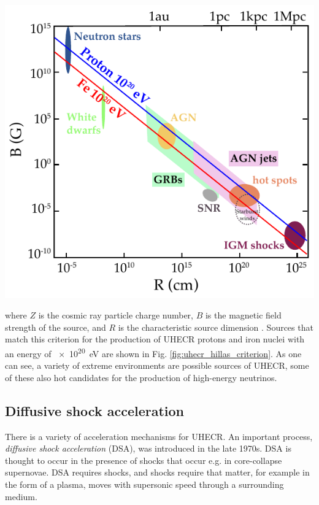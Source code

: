 \documentclass[
    a4paper, %
    fontsize=10pt, %
    twoside=false, %
    numbers=noenddot, %
    fontmethod=tex,
]{kaobook}
\begin{document}
\begin{marginfigure}
    \includegraphics{theory/uhecr_hillas_criterion.pdf}
    \caption[Hillas source distribution]{Possible sources for \SI{e20}{\eV} cosmic rays, as a function of source radius $R$ and the magnetic field strength $B$ of the source. Adapted from \cite{Rieger2022}, original `Hillas plot' in \cite{Hillas1984}.}
\end{marginfigure}

where $Z$ is the cosmic ray particle charge number, $B$ is the magnetic field strength of the source, and $R$ is the characteristic source dimension \cite{Rieger2022}. Sources that match this criterion for the production of UHECR protons and iron nuclei with an energy of \SI{e20}{\eV} are shown in Fig. \ref{fig:uhecr_hillas_criterion}. As one can see, a variety of extreme environments are possible sources of UHECR, some of these also hot candidates for the production of high-energy neutrinos. 

\subsection{Diffusive shock acceleration} \label{dsa}
There is a variety of acceleration mechanisms for UHECR. An important process, \textit{diffusive shock acceleration} (DSA), was introduced in the late 1970s. DSA is thought to occur in the presence of shocks that occur e.g. in core-collapse supernovae. DSA requires shocks, and shocks require that matter, for example in the form of a plasma, moves with supersonic speed through a surrounding medium.
\end{document}
